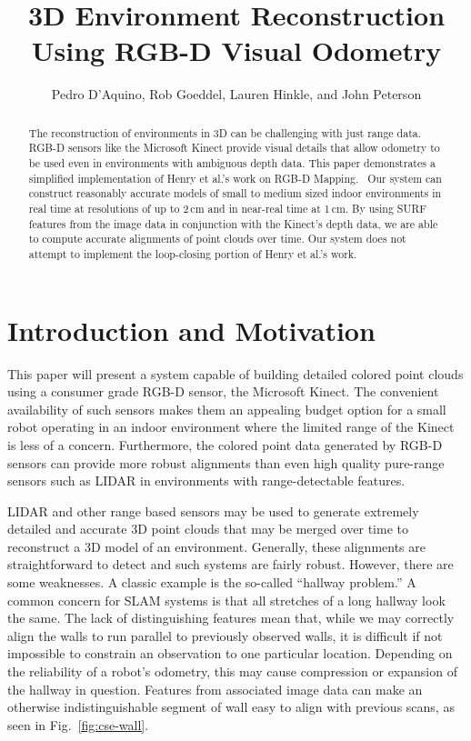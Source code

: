 \documentclass[letterpaper, 10pt, conference]{ieeeconf}
\title{\LARGE \bf
    3D Environment Reconstruction Using RGB-D Visual Odometry
}
\author{Pedro D'Aquino, Rob Goeddel, Lauren Hinkle, and John Peterson}
\begin{document}
\maketitle

\begin{abstract}
The reconstruction of environments in 3D can be challenging with just range
data. RGB-D sensors like the Microsoft Kinect provide visual details that
allow odometry to be used even in environments with ambiguous depth data.
This paper demonstrates a simplified implementation of Henry et al.'s work
on RGB-D Mapping.~\cite{Henry2010rgbd}
Our system can construct reasonably accurate models of
small to medium sized indoor environments in real time at resolutions of up
to 2\,cm and in near-real time at 1\,cm. By using SURF features from the image
data in conjunction with the Kinect's depth data, we are able to compute
accurate alignments of point clouds over time. Our system does not attempt to
implement the loop-closing portion of Henry et al.'s work.
\end{abstract}

\section{Introduction and Motivation}
This paper will present a system capable of building detailed colored point
clouds using a consumer grade RGB-D sensor, the Microsoft Kinect. The
convenient availability of such sensors makes them an appealing budget option
for a small robot operating in an indoor environment where the limited range
of the Kinect is less of a concern. Furthermore, the colored point data
generated by RGB-D sensors can provide more robust alignments than even high
quality pure-range sensors such as LIDAR in environments with range-detectable
features.

LIDAR and other range based sensors may be used to generate extremely detailed
and accurate 3D point clouds that may be merged over time to reconstruct a 3D
model of an environment. Generally, these alignments are straightforward to
detect and such systems are fairly robust. However, there are some weaknesses.
A classic example is the so-called ``hallway problem.'' A common concern for
SLAM systems is that all stretches of a long hallway look the same. The lack
of distinguishing features mean that, while we may correctly align the walls
to run parallel to previously observed walls, it is difficult if not
impossible to constrain an observation to one particular location. Depending
on the reliability of a robot's odometry, this may cause compression or
expansion of the hallway in question. Features from associated image data can
make an otherwise indistinguishable segment of wall easy to align with
previous scans, as seen in Fig.~\ref{fig:cse-wall}.
\end{document}
